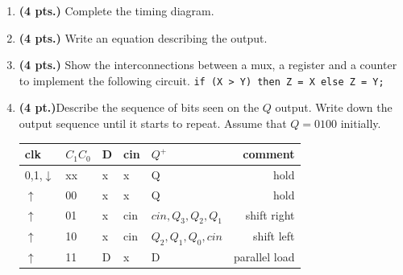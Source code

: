 \documentclass{article}
\begin{document}
\begin{enumerate}
\begin{tabular}{lr}
\begin{tabular}[!t]{l|l|l||l}
clk         & $C_1 C_0$ & D & $Q^+$ \\ \hline \hline
0,1,$\downarrow$ & xx   & x & Q     \\ \hline
$\uparrow$     & 00     & x & Q     \\  \hline
$\uparrow$     & 01     & x & 0     \\  \hline
$\uparrow$     & 10     & x & Q+1 mod 16  \\  \hline
$\uparrow$     & 11     & D & D     \\
\end{tabular}
&
\end{tabular}

\pagebreak

\item {\bf (4 pts.)} Complete the timing diagram.


\item {\bf (4 pts.)} Write an equation describing the output.

\vspace{0.3in}

\item {\bf (4 pts.)} Show the interconnections between a mux, a 
register and a counter to implement the following circuit.
\verb+if (X > Y) then Z = X else Z = Y;+
\vspace{0.3in}

\pagebreak
\item {\bf (4 pt.)}Describe the sequence of bits seen on the
$Q$ output.  Write down the output sequence until it starts to 
repeat.  Assume that $Q=0100$ initially.

\begin{tabular}{l|l|l|l||l|r}
clk         & $C_1 C_0$ & D & cin & $Q^+$ & comment \\ \hline \hline
0,1,$\downarrow$ & xx   & x & x   & Q     & hold     \\ \hline
$\uparrow$     & 00     & x & x   & Q     & hold     \\  \hline
$\uparrow$     & 01     & x & cin & $cin,Q_3,Q_2,Q_1$  & shift right \\  \hline
$\uparrow$     & 10     & x & cin & $Q_2,Q_1,Q_0,cin$  & shift left \\  \hline
$\uparrow$     & 11     & D & x   & D     & parallel load  \\ 
\end{tabular}


\end{enumerate}
\end{document}

